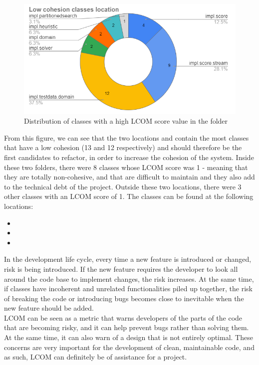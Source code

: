             \begin{figure}[H]
                \centering
                \includegraphics[scale=.7]{figures/step4/lowcohesion.PNG}
                \caption{Distribution of classes with a high LCOM score value in the  folder}
                \label{fig:lowcohesion}
            \end{figure}
            From this figure, we can see that the two locations  and  contain the most classes that have a low cohesion (13 and 12 respectively) and should therefore be the first candidates to refactor, in order to increase the cohesion of the system. Inside these two folders, there were 8 classes whose LCOM score was 1 - meaning that they are totally non-cohesive, and that are difficult to maintain and they also add to the technical debt of the project. Outside these two locations, there were 3 other classes with an LCOM score of 1. The classes can be found at the following locations:              
            \begin{itemize}
                \item {}
                \item {}
                \item {}
            \end{itemize}
            In the development life cycle, every time a new feature is introduced or changed, risk is being introduced. If the new feature requires the developer to look all around the code base to implement changes, the risk increases. At the same time, if classes have incoherent and unrelated functionalities piled up together, the risk of breaking the code or introducing bugs becomes close to inevitable when the new feature should be added.\\
            LCOM can be seen as a metric that warns developers of the parts of the code that are becoming risky, and it can help prevent bugs rather than solving them. At the same time, it can also warn of a design that is not entirely optimal. These concerns are very important for the development of clean, maintainable code, and as such, LCOM can definitely be of assistance for a project. \\
    
            

